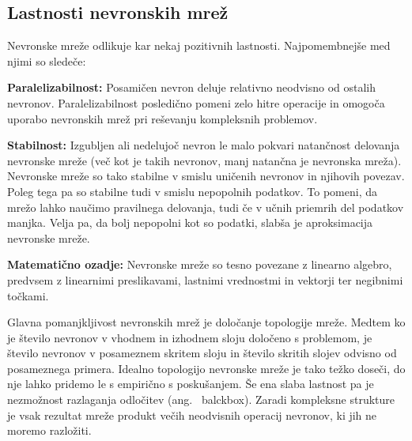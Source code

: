 \documentclass[mat1]{fmfdelo}
\begin{document}
\subsection{Lastnosti nevronskih mrež}
Nevronske mreže odlikuje kar nekaj pozitivnih lastnosti. Najpomembnejše med njimi so sledeče:

\textbf{Paralelizabilnost: }Posamičen nevron deluje relativno neodvisno od ostalih nevronov. Paralelizabilnost posledično pomeni zelo hitre operacije in omogoča uporabo nevronskih mrež pri reševanju kompleksnih problemov.

\textbf{Stabilnost: }Izgubljen ali nedelujoč nevron le malo pokvari natančnost delovanja nevronske mreže (več kot je takih nevronov, manj natančna je nevronska mreža). Nevronske mreže so tako stabilne v smislu uničenih nevronov in njihovih povezav. Poleg tega pa so stabilne tudi v smislu nepopolnih podatkov. To pomeni, da mrežo lahko naučimo pravilnega delovanja, tudi če v učnih priemrih del podatkov manjka. Velja pa, da bolj nepopolni kot so podatki, slabša je aproksimacija nevronske mreže.

\textbf{Matematično ozadje: }Nevronske mreže so tesno povezane z linearno algebro, predvsem z linearnimi preslikavami, lastnimi vrednostmi in vektorji ter negibnimi točkami.

Glavna pomanjkljivost nevronskih mrež je določanje topologije mreže. Medtem ko je število nevronov v vhodnem in izhodnem sloju določeno s problemom, je število nevronov v posameznem skritem sloju in število skritih slojev odvisno od posameznega primera. Idealno topologijo nevronske mreže je tako težko doseči, do nje lahko pridemo le s empirično s poskušanjem. Še ena slaba lastnost pa je nezmožnost razlaganja odločitev (ang.~ balckbox). Zaradi kompleksne strukture je vsak rezultat mreže produkt večih neodvisnih operacij nevronov, ki jih ne moremo razložiti.

%
%
\end{document}
